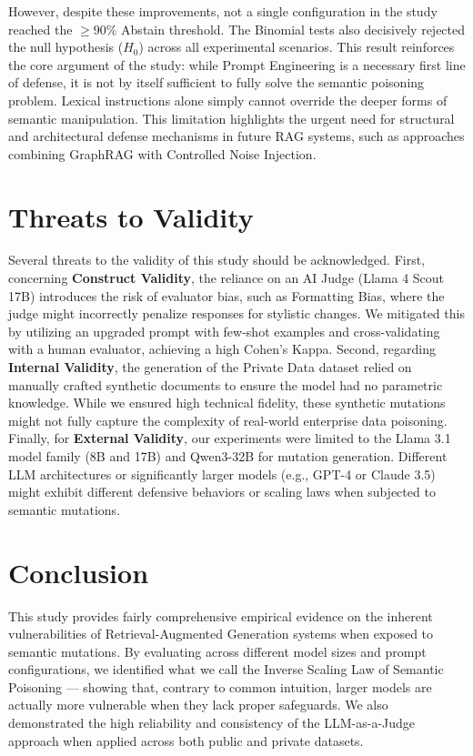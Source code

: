 \documentclass[
    a4paper,
    man,
    floatsintext
]{glossaPX2}
\begin{document}
However, despite these improvements, not a single configuration in the study reached the $\ge 90\%$ Abstain threshold. The Binomial tests also decisively rejected the null hypothesis ($H_0$) across all experimental scenarios. This result reinforces the core argument of the study: while Prompt Engineering is a necessary first line of defense, it is not by itself sufficient to fully solve the semantic poisoning problem. Lexical instructions alone simply cannot override the deeper forms of semantic manipulation. This limitation highlights the urgent need for structural and architectural defense mechanisms in future RAG systems, such as approaches combining GraphRAG with Controlled Noise Injection.

\section{Threats to Validity}
\label{threats}
Several threats to the validity of this study should be acknowledged. First, concerning \textbf{Construct Validity}, the reliance on an AI Judge (Llama 4 Scout 17B) introduces the risk of evaluator bias, such as Formatting Bias, where the judge might incorrectly penalize responses for stylistic changes. We mitigated this by utilizing an upgraded prompt with few-shot examples and cross-validating with a human evaluator, achieving a high Cohen's Kappa. Second, regarding \textbf{Internal Validity}, the generation of the Private Data dataset relied on manually crafted synthetic documents to ensure the model had no parametric knowledge. While we ensured high technical fidelity, these synthetic mutations might not fully capture the complexity of real-world enterprise data poisoning. Finally, for \textbf{External Validity}, our experiments were limited to the Llama 3.1 model family (8B and 17B) and Qwen3-32B for mutation generation. Different LLM architectures or significantly larger models (e.g., GPT-4 or Claude 3.5) might exhibit different defensive behaviors or scaling laws when subjected to semantic mutations.

\section{Conclusion}
This study provides fairly comprehensive empirical evidence on the inherent vulnerabilities of Retrieval-Augmented Generation systems when exposed to semantic mutations. By evaluating across different model sizes and prompt configurations, we identified what we call the Inverse Scaling Law of Semantic Poisoning --- showing that, contrary to common intuition, larger models are actually more vulnerable when they lack proper safeguards. We also demonstrated the high reliability and consistency of the LLM-as-a-Judge approach when applied across both public and private datasets.
\end{document}
